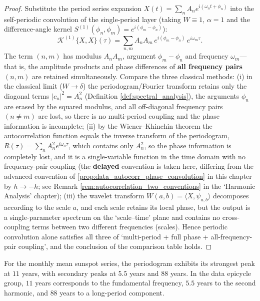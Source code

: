 \begin{proof}
Substitute the period series expansion $X(t) = \sum_n A_n e^{i(\omega_n t + \phi_n)}$ into the self-periodic convolution of the single-period layer (taking $W \equiv 1$, $\alpha = 1$ and the difference-angle kernel $S^{(1)}(\phi_n, \phi_m) = e^{i(\phi_m - \phi_n)}$):
\[
\mathcal{K}^{(1)}\{X, X\}(\tau) = \sum_{n,m} A_n A_m \, e^{i(\phi_m - \phi_n)} \, e^{i\omega_m \tau}.
\]
The term $(n,m)$ has modulus $A_n A_m$, argument $\phi_m - \phi_n$ and frequency $\omega_m$---that is, the amplitude products and phase differences of \textbf{all frequency pairs} $(n,m)$ are retained simultaneously. Compare the three classical methods: (i) in the classical limit ($W \to \delta$) the periodogram/Fourier transform retains only the diagonal terms $|c_n|^2 = A_n^2$ (Definition \ref{def:spectral_analysis}), the arguments $\phi_n$ are erased by the squared modulus, and all off-diagonal frequency pairs $(n \neq m)$ are lost, so there is no multi-period coupling and the phase information is incomplete; (ii) by the Wiener--Khinchin theorem the autocorrelation function equals the inverse transform of the periodogram, $R(\tau) = \sum_n A_n^2 e^{i\omega_n \tau}$, which contains only $A_n^2$, so the phase information is completely lost, and it is a single-variable function in the time domain with no frequency-pair coupling (the \textbf{delayed} convention is taken here, differing from the advanced convention of \cref{prop:data_autocorr_phase_convolution} in this chapter by $h\to-h$; see Remark \ref{rem:autocorrelation_two_conventions} in the `Harmonic Analysis' chapter); (iii) the wavelet transform $W(a,b) = \langle X, \psi_{a,b}\rangle$ decomposes according to the scale $a$, and each scale retains its local phase, but the output is a single-parameter spectrum on the `scale--time' plane and contains no cross-coupling terms between two different frequencies (scales). Hence periodic convolution alone satisfies all three of `multi-period + full phase + all-frequency-pair coupling', and the conclusion of the comparison table holds.
\end{proof}

\begin{example}\label{ex:data_series_example}
For the monthly mean sunspot series, the periodogram exhibits its strongest peak at $11$ years, with secondary peaks at $5.5$ years and $88$ years. In the data epicycle group, $11$ years corresponds to the fundamental frequency, $5.5$ years to the second harmonic, and $88$ years to a long-period component.
\end{example}

